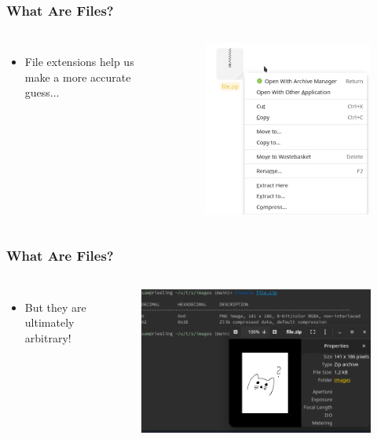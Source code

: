 \documentclass[fleqn]{beamer}
\begin{document}
\begin{frame}
  \frametitle{What Are Files?}
  \begin{columns}[T]
    \column{\textwidth}
    \begin{itemize}
      \item File extensions help us make a more accurate guess...
    \end{itemize}
    \begin{figure}[H]
      \centering
      \includegraphics[scale=0.5]{images/is_it_an_archive.png}
    \end{figure}
  \end{columns}
\end{frame}

\begin{frame}
  \frametitle{What Are Files?}
  \begin{columns}[T]
    \column{\textwidth}
    \begin{itemize}
      \item But they are ultimately arbitrary!
    \end{itemize}
    \begin{figure}[H]
      \centering
      \includegraphics[scale=0.5]{images/lies_and_deciet_it_was_not_an_archive.png}
    \end{figure}
  \end{columns}
\end{frame}
\end{document}
